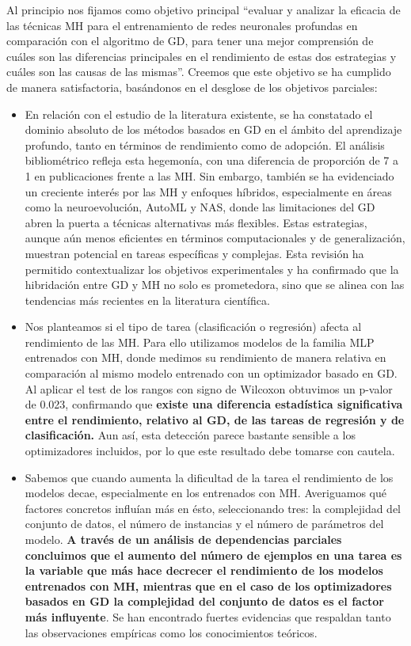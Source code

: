 Al principio nos fijamos como objetivo principal ``evaluar y analizar la eficacia de las técnicas MH para el entrenamiento de redes neuronales profundas en comparación con el algoritmo de GD, para tener una mejor comprensión de cuáles son las diferencias principales en el rendimiento de estas dos estrategias y cuáles son las causas de las mismas''. Creemos que este objetivo se ha cumplido de manera satisfactoria, basándonos en el desglose de los objetivos parciales:
\begin{itemize}

\item En relación con el estudio de la literatura existente, se ha constatado el dominio absoluto de los métodos basados en GD en el ámbito del aprendizaje profundo, tanto en términos de rendimiento como de adopción. El análisis bibliométrico refleja esta hegemonía, con una diferencia de proporción de 7 a 1 en publicaciones frente a las MH. Sin embargo, también se ha evidenciado un creciente interés por las MH y enfoques híbridos, especialmente en áreas como la neuroevolución, AutoML y NAS, donde las limitaciones del GD abren la puerta a técnicas alternativas más flexibles. Estas estrategias, aunque aún menos eficientes en términos computacionales y de generalización, muestran potencial en tareas específicas y complejas. Esta revisión ha permitido contextualizar los objetivos experimentales y ha confirmado que la hibridación entre GD y MH no solo es prometedora, sino que se alinea con las tendencias más recientes en la literatura científica.

\item Nos planteamos si el tipo de tarea (clasificación o regresión) afecta al rendimiento de las MH. Para ello utilizamos modelos de la familia MLP entrenados con MH, donde medimos su rendimiento de manera relativa en comparación al mismo modelo entrenado con un optimizador basado en GD. Al aplicar el test de los rangos con signo de Wilcoxon obtuvimos un p-valor de 0.023, confirmando que\textbf{ existe una diferencia estadística significativa entre el rendimiento, relativo al GD, de las tareas de regresión y de clasificación.} Aun así, esta detección parece bastante sensible a los optimizadores incluidos, por lo que este resultado debe tomarse con cautela.

\item Sabemos que cuando aumenta la dificultad de la tarea el rendimiento de los modelos decae, especialmente en los entrenados con MH. Averiguamos qué factores concretos influían más en ésto, seleccionando tres: la complejidad del conjunto de datos, el número de instancias y el número de parámetros del modelo. \textbf{A través de un análisis de dependencias parciales concluimos que el aumento del número de ejemplos en una tarea es la variable que más hace decrecer el rendimiento de los modelos entrenados con MH, mientras que en el caso de los optimizadores basados en GD la complejidad del conjunto de datos es el factor más influyente}. Se han encontrado fuertes evidencias que respaldan tanto las observaciones empíricas como los conocimientos teóricos.


\end{itemize}
